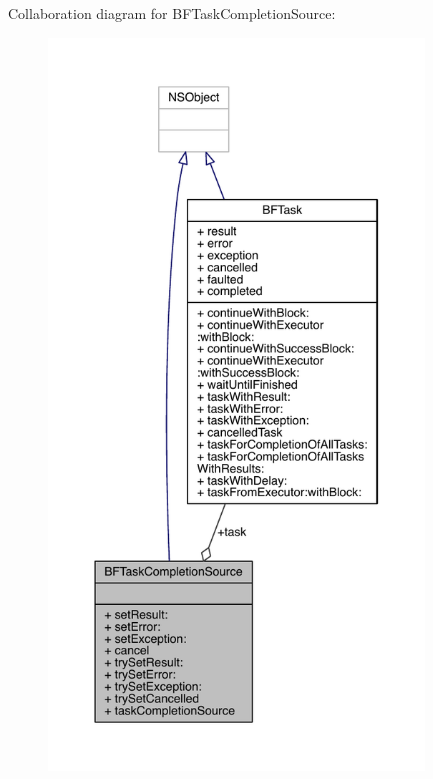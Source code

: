 Collaboration diagram for B\-F\-Task\-Completion\-Source\-:
\nopagebreak
\begin{figure}[H]
\begin{center}
\leavevmode
\includegraphics[height=550pt]{interface_b_f_task_completion_source__coll__graph}
\end{center}
\end{figure}

